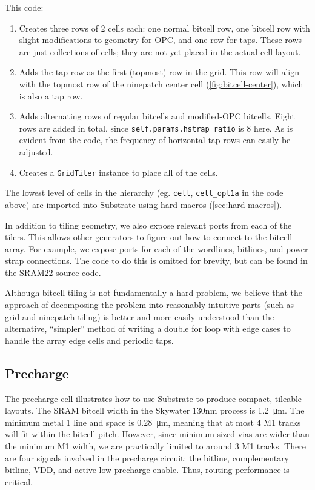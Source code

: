 This code:
\begin{enumerate}
\item Creates three rows of 2 cells each: one normal bitcell row, one bitcell row with slight modifications
  to geometry for OPC, and one row for taps. These rows are just collections of cells; they are not
  yet placed in the actual cell layout.
\item Adds the tap row as the first (topmost) row in the grid. This row will align with the topmost row
  of the ninepatch center cell (\ref{fig:bitcell-center}), which is also a tap row.
\item Adds alternating rows of regular bitcells and modified-OPC bitcells. Eight rows are added in total,
  since \verb|self.params.hstrap_ratio| is 8 here. As is evident from the code, the frequency of horizontal
  tap rows can easily be adjusted.
\item Creates a \verb|GridTiler| instance to place all of the cells.
\end{enumerate}

The lowest level of cells in the hierarchy (eg. \verb|cell|, \verb|cell_opt1a| in the code above) are imported
into Substrate using hard macros (\ref{sec:hard-macros}).

In addition to tiling geometry, we also expose relevant ports from each of the tilers. This allows
other generators to figure out how to connect to the bitcell array. For example, we expose ports for
each of the wordlines, bitlines, and power strap connections. The code to do this is omitted for brevity,
but can be found in the SRAM22 source code.

Although bitcell tiling is not fundamentally a hard problem, we believe that the approach of decomposing
the problem into reasonably intuitive parts (such as grid and ninepatch tiling) is better and more easily understood
than the alternative, ``simpler'' method of writing a double for loop
with edge cases to handle the array edge cells and periodic taps.

\subsection{Precharge} \label{sec:precharge-layout}

The precharge cell illustrates how to use Substrate to produce compact, tileable layouts.
The SRAM bitcell width in the Skywater 130nm process is \SI{1.2}{\micro\meter}.
The minimum metal 1 line and space is \SI{0.28}{\micro\meter},
meaning that at most 4 M1 tracks will fit within the bitcell pitch. However, since minimum-sized vias are wider
than the minimum M1 width, we are practically limited to around 3 M1 tracks. There are four signals involved
in the precharge circuit: the bitline, complementary bitline, VDD, and active low precharge enable.
Thus, routing performance is critical.

